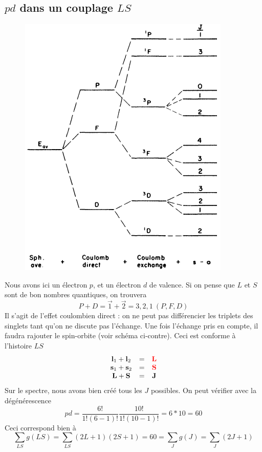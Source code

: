 \subsection{$pd$ dans un couplage $LS$}
	\begin{figure}
	\vspace{-5mm}
	\includegraphics[scale=0.5]{ch1/image11}
	\end{figure}
Nous avons ici un électron $p$, et un électron $d$ de valence. Si on pense
que $L$ et $S$ sont de bon nombres quantiques, on trouvera
\begin{equation}
P+D = \vec{1}+\vec 2 = 3,2,1\  (P, F, D)
\end{equation}
Il s'agit de l'effet coulombien direct : on ne peut pas différencier les 
triplets des singlets tant qu'on ne discute pas l'échange. Une fois l'échange
pris en compte, il faudra rajouter le spin-orbite (voir schéma ci-contre). Ceci
est conforme à l'histoire $LS$
\begin{equation}
\begin{array}{ccc}
{\bf l}_1 +   {\bf  l}_2  & = & {\color{red} {\bf  L}} \\
{\bf s}_1 +   {\bf  s}_2  & = & {\color{red}{\bf  S}} \\
{\bf L} +   {\bf  S}  & = & {\bf  J}
\end{array}
\end{equation}
Sur le spectre, nous avons bien créé tous les $J$ possibles. On peut vérifier
avec la dégénérescence
\begin{equation}
pd = \dfrac{6!}{1!(6-1)!}\dfrac{10!}{1!(10-1)!}=6*10=60
\end{equation}
Ceci correspond bien à 
\begin{equation}
\sum_{LS} g(LS) = \sum_{LS} (2L+1)(2S+1) = 60 = \sum_J g(J) = \sum_J(2J+1)
\end{equation}


